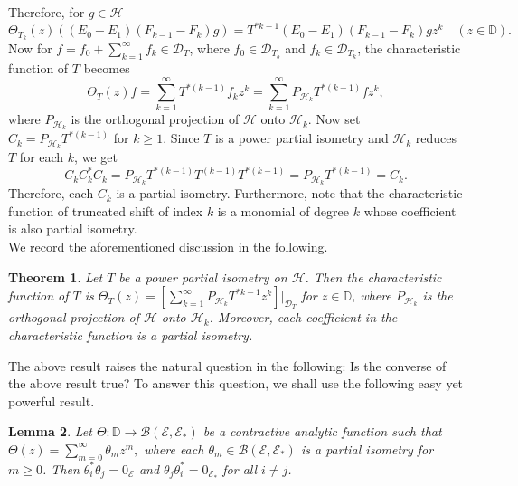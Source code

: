 \documentclass[12pt]{amsart}
\newcommand{\clb}{\mathcal{B}}
\newcommand{\cle}{\mathcal{E}}
\newcommand{\clh}{\mathcal{H}}
\newcommand{\D}{\mathbb{D}}
\newcommand{\E}{\mathcal{E}}
\newcommand{\dt}{\mathcal{D}}
\theoremstyle{definition}
\theoremstyle{plain}
\newtheorem{thm}{Theorem}[section]
\newtheorem{lem}[thm]{Lemma}
\theoremstyle{definition}
\numberwithin{equation}{section}
\begin{document}
Therefore, for $ g \in \clh$
\[
\Theta_{T_k}( z)((E_0-E_1)(F_{k-1}-F_k)g)= T^{*k-1}(E_{0}-E_1)(F_{k-1}-F_k)g z^k \quad (z \in \D). 
\]
Now for $f=f_0 +\sum\limits_{k=1}^\infty f_k \in \dt_T$, where $f_0 \in \dt_{T_b}$ and $f_k \in \dt_{T_k}$, the characteristic function of $T$ becomes
\[
\Theta_T( z)f=\sum\limits _{k=1}^\infty   T^{*(k-1)}f_kz^k=\sum\limits _{k=1}^\infty P_{\mathcal{H}_k} T^{*(k-1)}fz^k,
\]
where $P_{\mathcal{H}_k}$ is the orthogonal projection of $\clh$ onto $\mathcal{H}_k$. Now set $C_k = P_{\mathcal{H}_k} T^{*(k-1)}$ for $k \geq 1$. Since $T$ is a power partial isometry and $\clh_k$ reduces $T$ for each $k$, we get
\[
C_kC_k^*C_k = P_{\mathcal{H}_k} T^{*(k-1)} T^{(k-1)}T^{*(k-1)} = P_{\mathcal{H}_k} T^{*(k-1)}= C_k.
\]
Therefore, each $C_k$ is a partial isometry. Furthermore, note that the characteristic function of truncated shift of index $k$ is a monomial of degree $k$ whose coefficient is also partial isometry. \\




We record the aforementioned discussion in the following.

\begin{thm} \label{mainthm}
Let $T$ be a power partial isometry on $\clh$. Then the characteristic function of $T$ is $\Theta_T( z) = \left[\sum\limits _{k=1}^\infty P_{\mathcal{H}_k} T^{*k-1}z^k \right]\Big|_{\dt_T}$ for $z \in \D$, where $P_{\mathcal{H}_k}$ is the orthogonal projection of $\clh$ onto $\mathcal{H}_k$. Moreover, each coefficient in the characteristic function is a partial isometry.
\end{thm}





The above result raises the natural question in the following:
\textsf{\textsf{Is the converse of the above result true?}} 
To answer this question, we shall use the following easy yet powerful result.

\begin{lem}\label{Main-Lemma}
Let $\Theta : \D \rightarrow \clb(\E,\E_*)$ be a contractive analytic function such that $\Theta( z)=\sum\limits_{m=0}^\infty  \theta_mz^m,$ where each $\theta_m \in \clb(\cle,\cle_*)$ is a partial isometry for $m \geq 0$. Then $\theta_i^*\theta_j=0_{\cle}$ and $\theta_j\theta_i^*=0_{\cle_*}$ for all $i \neq j$.
\end{lem}
\end{document}
